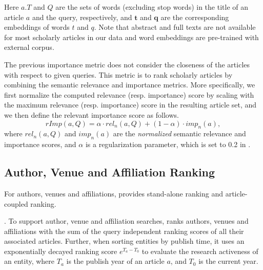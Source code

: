 Here $a.T$ and $Q$ are the sets of words (excluding stop words) in the title of an article $a$ and the query, respectively, %
and $\textbf{t}$ and $\textbf{q}$ are the corresponding embeddings of words $t$ and $q$. 
Note that abstract and full texts are not available for most scholarly articles in our data and word embeddings are pre-trained with external corpus.




 The previous importance metric does not consider the closeness of the articles with respect to given queries. This metric is to rank scholarly articles by combining the semantic relevance and importance metrics. More specifically, we first normalize the computed relevance (resp. importance) score by scaling with the maximum relevance (resp. importance) score in the resulting article set, and we then define the relevant importance score as follows.
\begin{equation}
\label{eq:relimp}
rImp(a, Q) = \alpha \cdot rel_n(a, Q) + (1-\alpha)\cdot imp_n(a),
\end{equation}
where $rel_n(a, Q)$ and $imp_n(a)$ are the {\em normalized} semantic relevance and importance scores, and $\alpha$ is a regularization parameter, which is set to 0.2 in \oursystem.



\subsection{Author, Venue and Affiliation Ranking}
\label{subsec:heteroRanking}

For authors, venues and affiliations,  \oursystem provides stand-alone ranking and article-coupled ranking.

. To support author, venue and affiliation searches, \oursystem ranks authors, venues and affiliations with the sum of the query independent ranking scores of all their associated articles. Further, when sorting entities by publish time, it uses an exponentially decayed ranking score $e^{T_a-T_0}$ to evaluate the research activeness of an entity, where $T_a$ is the publish year of an article $a$, and $T_0$ is the current year.


